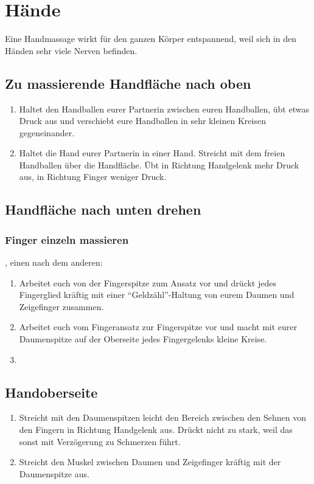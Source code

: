\section{Hände}

Eine Handmassage wirkt für den ganzen Körper entspannend, weil sich in den Händen sehr viele Nerven befinden.

\subsection{Zu massierende Handfläche nach oben}
\begin{enumerate}
	\item {} Haltet den Handballen eurer Partnerin zwischen euren Handballen, übt etwas Druck aus und verschiebt eure Handballen in sehr kleinen Kreisen gegeneinander.
	\item {} Haltet die Hand eurer Partnerin in einer Hand. Streicht mit dem freien Handballen über die Handfläche. Übt in Richtung Handgelenk mehr Druck aus, in Richtung Finger weniger Druck.
\end{enumerate}


\subsection{Handfläche nach unten drehen}

\subsubsection{Finger einzeln massieren}

, einen nach dem anderen:

\begin{enumerate}
	\item {} Arbeitet euch von der Fingerspitze zum Ansatz vor und drückt jedes Fingerglied kräftig mit einer "`Geldzähl"'-Haltung von eurem Daumen und Zeigefinger zusammen.
	\item {} Arbeitet euch vom Fingeransatz zur Fingerspitze vor und macht mit eurer Daumenspitze auf der Oberseite jedes Fingergelenks kleine Kreise.
	\item {}
\end{enumerate}

\subsection{Handoberseite}
\begin{enumerate}
	\item {} Streicht mit den Daumenspitzen leicht den Bereich zwischen den Sehnen von den Fingern in Richtung Handgelenk aus. Drückt nicht zu stark, weil das sonst mit Verzögerung zu Schmerzen führt.
	\item {} Streicht den Muskel zwischen Daumen und Zeigefinger kräftig mit der Daumenspitze aus.
\end{enumerate}

